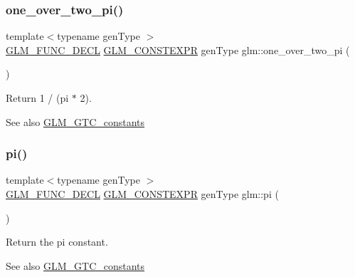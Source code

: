 \subsubsection{\texorpdfstring{one\+\_\+over\+\_\+two\+\_\+pi()}{one\_over\_two\_pi()}}
{\footnotesize\ttfamily template$<$typename gen\+Type $>$ \\
\hyperlink{setup_8hpp_ab2d052de21a70539923e9bcbf6e83a51}{G\+L\+M\+\_\+\+F\+U\+N\+C\+\_\+\+D\+E\+CL} \hyperlink{setup_8hpp_a08b807947b47031d3a511f03f89645ad}{G\+L\+M\+\_\+\+C\+O\+N\+S\+T\+E\+X\+PR} gen\+Type glm\+::one\+\_\+over\+\_\+two\+\_\+pi (\begin{DoxyParamCaption}{ }\end{DoxyParamCaption})}

Return 1 / (pi $\ast$ 2). \begin{DoxySeeAlso}{See also}
\hyperlink{group__gtc__constants}{G\+L\+M\+\_\+\+G\+T\+C\+\_\+constants} 
\end{DoxySeeAlso}
\mbox{\label{group__gtc__constants_ga94bafeb2a0f23ab6450fed1f98ee4e45}} 
\subsubsection{\texorpdfstring{pi()}{pi()}}
{\footnotesize\ttfamily template$<$typename gen\+Type $>$ \\
\hyperlink{setup_8hpp_ab2d052de21a70539923e9bcbf6e83a51}{G\+L\+M\+\_\+\+F\+U\+N\+C\+\_\+\+D\+E\+CL} \hyperlink{setup_8hpp_a08b807947b47031d3a511f03f89645ad}{G\+L\+M\+\_\+\+C\+O\+N\+S\+T\+E\+X\+PR} gen\+Type glm\+::pi (\begin{DoxyParamCaption}{ }\end{DoxyParamCaption})}

Return the pi constant. \begin{DoxySeeAlso}{See also}
\hyperlink{group__gtc__constants}{G\+L\+M\+\_\+\+G\+T\+C\+\_\+constants} 
\end{DoxySeeAlso}
\mbox{\label{group__gtc__constants_ga3c9df42bd73c519a995c43f0f99e77e0}} 
